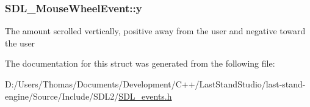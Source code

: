 \subsubsection[{y}]{ S\+D\+L\+\_\+\+Mouse\+Wheel\+Event\+::y}\label{structSDL__MouseWheelEvent_a53fdf77a464426bc8b30e629795f044b}
The amount scrolled vertically, positive away from the user and negative toward the user 

The documentation for this struct was generated from the following file\+:\begin{DoxyCompactItemize}
\item 
D\+:/\+Users/\+Thomas/\+Documents/\+Development/\+C++/\+Last\+Stand\+Studio/last-\/stand-\/engine/\+Source/\+Include/\+S\+D\+L2/\hyperlink{SDL__events_8h}{S\+D\+L\+\_\+events.\+h}\end{DoxyCompactItemize}
